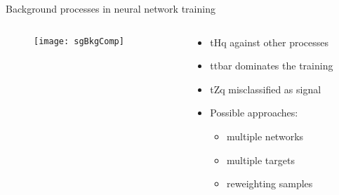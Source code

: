 \begin{frame}{Background processes in neural network training}
    \begin{columns}
        \begin{column}{0.5\textwidth}
            \begin{figure}
                \centering
                \texttt{[image: sgBkgComp]}
            \end{figure}
        \end{column}
        \begin{column}{0.5\textwidth}
            \begin{itemize}
                \item tHq against other processes
                \vspace{0.5cm}
                \item ttbar dominates the training
                \vspace{0.5cm}
                \item tZq misclassified as signal
                \vspace{0.5cm}
                \item Possible approaches:
                    \begin{itemize}
                        \item multiple networks
                        \item multiple targets
                        \item reweighting samples
                    \end{itemize} 
            \end{itemize}
        \end{column}
    \end{columns}
\end{frame}

